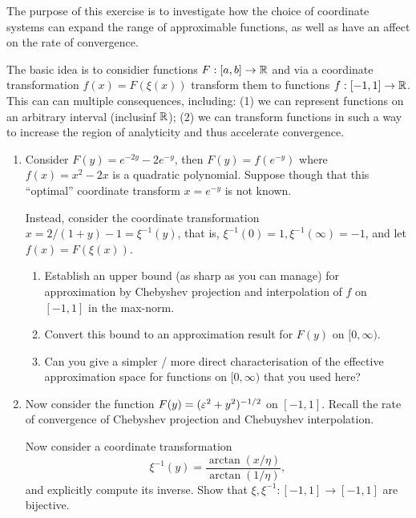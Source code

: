 \begin{exercise}
   \label{exr:poly:coordinates}
   The purpose of this exercise is to investigate how the choice of 
   coordinate systems can expand the range of approximable functions, as 
   well as have an affect on the rate of convergence.

   The basic idea is to considier functions $F : [a, b] \to \mathbb{R}$ and via a
   coordinate transformation $f(x) = F(\xi(x))$ transform them to functions $f :
   [-1,1] \to \mathbb{R}$. This can can multiple consequences, including: (1) we can
   represent functions on an arbitrary interval (inclusinf $\mathbb{R}$); (2) we can
   transform functions in such a way to increase the region of analyticity and
   thus accelerate convergence.
   \begin{enumerate} \ilist
      \item Consider $F(y) = e^{-2y} - 2 e^{-y}$, then $F(y) = f(e^{-y})$ where
      $f(x) = x^2 - 2x$ is a quadratic polynomial. Suppose though that this
      ``optimal'' coordinate transform $x = e^{-y}$ is not known. 

      Instead, consider the coordinate transformation $x = 2/(1+y) - 1 =
      \xi^{-1}(y)$, that is, $\xi^{-1}(0) = 1, \xi^{-1}(\infty) = -1$, and 
      let $f(x) = F(\xi(x))$. 
      \begin{enumerate} \alist 
         \item Establish an upper bound (as sharp as you can manage) for
          approximation by Chebyshev projection and interpolation of $f$ on
          $[-1,1]$ in the max-norm. 
         \item Convert this bound to an approximation result for $F(y)$ on $[0,
          \infty)$. 
         \item Can you give a simpler / more direct characterisation of the
         effective approximation space for functions on $[0, \infty)$ that you
         used here?
      \end{enumerate}
      
      \item Now consider the function $F(y) = (\varepsilon^2 + y^2)^{-1/2}$ on 
      $[-1, 1]$. Recall the rate of convergence of Chebyshev projection and 
      Chebuyshev interpolation. 

      Now consider a coordinate transformation 
      \[
         \xi^{-1}(y) = \frac{\arctan(x/\eta)}{\arctan(1/\eta)},
      \]
      and explicitly compute its inverse. Show that $\xi, \xi^{-1} : [-1,1] \to
      [-1,1]$ are bijective. 


\end{enumerate}
\end{exercise}
